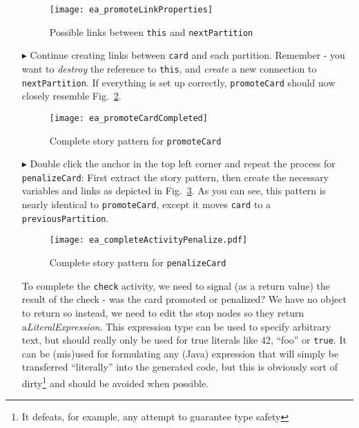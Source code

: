 \begin{itemize}
\begin{figure}[htbp]
\begin{center}
  \texttt{[image: ea\_promoteLinkProperties]}
  \caption{Possible links between \texttt{this} and \texttt{nextPartition}}
  \label{fig:sdm_check_link_variable}
\end{center}
\end{figure}

\vspace{0.5cm}

\item[$\blacktriangleright$] Continue creating links between \texttt{card} and each partition. Remember - you want to \emph{destroy} the reference to
\texttt{this}, and \emph{create} a new connection to \texttt{nextPartition}. If everything is set up correctly, \texttt{promoteCard} should now closely resemble
Fig.~\ref{fig:sdm_check_complete_activity_node}.

\begin{figure}[htbp]
\begin{center}
  \texttt{[image: ea\_promoteCardCompleted]}
  \caption{Complete story pattern for \texttt{promoteCard}}
  \label{fig:sdm_check_complete_activity_node}
\end{center}
\end{figure}

\clearpage

\item[$\blacktriangleright$] Double click the anchor in the top left corner and repeat the process for \texttt{penalizeCard}: First extract the story pattern,
then create the necessary variables and links as depicted in Fig.~\ref{fig:sdm_check_complete_penalize}. As you can see, this pattern is nearly identical to
\texttt{promoteCard}, except it moves \texttt{card} to a \texttt{previousPartition}.

\vspace{0.5cm}

\begin{figure}[htbp]
\begin{center}
  \texttt{[image: ea\_completeActivityPenalize.pdf]}
  \caption{Complete story pattern for \texttt{penalizeCard}}
  \label{fig:sdm_check_complete_penalize}
\end{center}
\end{figure}


\vspace{0.5cm}

To complete the \texttt{check} activity, we need to signal (as a return value) the result of the check - was the card promoted or penalized? We have no object
to return so instead, we need to edit the stop nodes so they return a\emph{LiteralExpression}. This expression type can be used to
specify arbitrary text, but should really only be used for true literals like 42, ``foo'' or \texttt{true}. It can be (mis)used for formulating any (Java)
expression that will simply be transferred ``literally'' into the generated code, but this is obviously sort of dirty\footnote{It defeats, for example, any
attempt to guarantee type safety} and should be avoided when possible.


\end{itemize}
